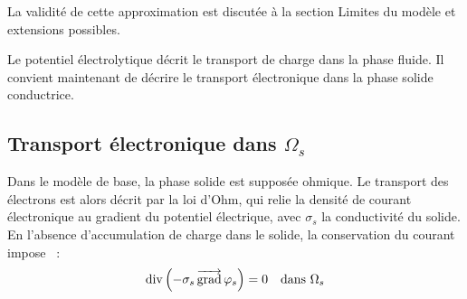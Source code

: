 La validité de cette approximation est discutée à la section \og Limites du modèle et extensions possibles\fg{}.





Le potentiel électrolytique décrit le transport de charge dans la phase
fluide. Il convient maintenant de décrire le transport électronique dans
la phase solide conductrice.

\subsection*{Transport électronique dans $\Omega_s$}

Dans le modèle de base, la phase solide est supposée ohmique.
Le transport des électrons est alors décrit par la loi d'Ohm,
qui relie la densité de courant électronique
au gradient du potentiel électrique, avec $\sigma_s$ la conductivité du solide.
En l'absence d'accumulation de charge dans le
solide, la conservation du courant impose~\cite{newmanTheoreticalAnalysisCurrent1962, newmanPorouselectrodeTheoryBattery1975} :
\begin{equation}
\operatorname{div}\left(-\sigma_s \mathop{\overrightarrow{\operatorname{grad}}}\nolimits \varphi_s\right) = 0 \quad \text{dans } \Omega_s
\label{eq:ohm}
\end{equation}

